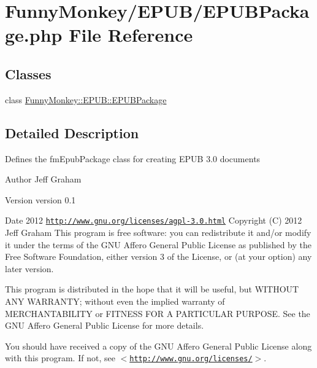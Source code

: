 \hypertarget{EPUBPackage_8php}{
\section{FunnyMonkey/EPUB/EPUBPackage.php File Reference}
\label{EPUBPackage_8php}
}
\subsection*{Classes}
\begin{DoxyCompactItemize}
\item 
class \hyperlink{classFunnyMonkey_1_1EPUB_1_1EPUBPackage}{FunnyMonkey::EPUB::EPUBPackage}
\end{DoxyCompactItemize}


\subsection{Detailed Description}
Defines the fmEpubPackage class for creating EPUB 3.0 documents

\begin{DoxyAuthor}{Author}
Jeff Graham 
\end{DoxyAuthor}
\begin{DoxyVersion}{Version}
version 0.1 
\end{DoxyVersion}
\begin{DoxyDate}{Date}
2012  \href{http://www.gnu.org/licenses/agpl-3.0.html}{\tt http://www.gnu.org/licenses/agpl-\/3.0.html} Copyright (C) 2012 Jeff Graham This program is free software: you can redistribute it and/or modify it under the terms of the GNU Affero General Public License as published by the Free Software Foundation, either version 3 of the License, or (at your option) any later version.
\end{DoxyDate}
This program is distributed in the hope that it will be useful, but WITHOUT ANY WARRANTY; without even the implied warranty of MERCHANTABILITY or FITNESS FOR A PARTICULAR PURPOSE. See the GNU Affero General Public License for more details.

You should have received a copy of the GNU Affero General Public License along with this program. If not, see $<$\href{http://www.gnu.org/licenses/}{\tt http://www.gnu.org/licenses/}$>$.

